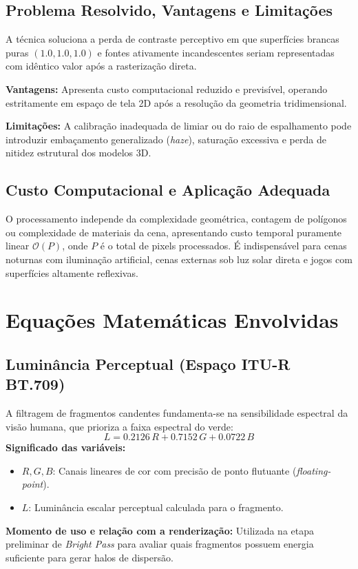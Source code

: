 \documentclass[12pt,a4paper]{article}
\begin{document}
\subsection{Problema Resolvido, Vantagens e Limitações}
A técnica soluciona a perda de contraste perceptivo em que superfícies brancas puras $(1.0, 1.0, 1.0)$ e fontes ativamente incandescentes seriam representadas com idêntico valor após a rasterização direta.

\textbf{Vantagens:} Apresenta custo computacional reduzido e previsível, operando estritamente em espaço de tela 2D após a resolução da geometria tridimensional.

\textbf{Limitações:} A calibração inadequada de limiar ou do raio de espalhamento pode introduzir embaçamento generalizado (\textit{haze}), saturação excessiva e perda de nitidez estrutural dos modelos 3D.

\subsection{Custo Computacional e Aplicação Adequada}
\label{sec:custo}
O processamento independe da complexidade geométrica, contagem de polígonos ou complexidade de materiais da cena, apresentando custo temporal puramente linear $\mathcal{O}(P)$, onde $P$ é o total de pixels processados. É indispensável para cenas noturnas com iluminação artificial, cenas externas sob luz solar direta e jogos com superfícies altamente reflexivas.

\section{Equações Matemáticas Envolvidas}
\label{sec:equacoes}

\subsection{Luminância Perceptual (Espaço ITU-R BT.709)}
A filtragem de fragmentos candentes fundamenta-se na sensibilidade espectral da visão humana, que prioriza a faixa espectral do verde:
\begin{equation}
    L = 0.2126\,R + 0.7152\,G + 0.0722\,B
    \label{eq:luminancia}
\end{equation}
\textbf{Significado das variáveis:}
\begin{itemize}
    \item $R, G, B$: Canais lineares de cor com precisão de ponto flutuante (\textit{floating-point}).
    \item $L$: Luminância escalar perceptual calculada para o fragmento.
\end{itemize}
\textbf{Momento de uso e relação com a renderização:} Utilizada na etapa preliminar de \textit{Bright Pass} para avaliar quais fragmentos possuem energia suficiente para gerar halos de dispersão.
\end{document}
